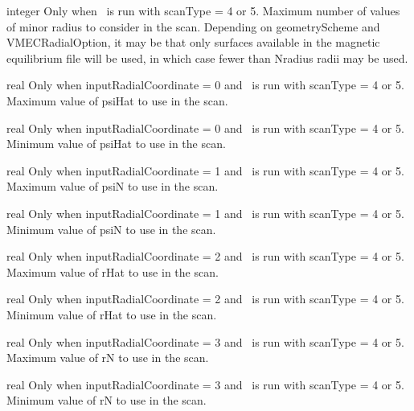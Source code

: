 \myhrule

{integer}
{Only when \sfincsScan~is run with {\ttfamily scanType} = 4 or 5.}
{Maximum number of values of minor radius to consider in the scan.
Depending on {\ttfamily geometryScheme} and {\ttfamily VMECRadialOption},
it may be that only surfaces available in the magnetic equilibrium file will be
used, in which case fewer than {\ttfamily Nradius} radii may be used.}

\myhrule

{real}
{Only when {\ttfamily inputRadialCoordinate} = 0 and \sfincsScan~is run with {\ttfamily scanType} = 4 or 5.}
{Maximum value of {\ttfamily psiHat} to use in the scan.}

\myhrule

{real}
{Only when {\ttfamily inputRadialCoordinate} = 0 and \sfincsScan~is run with {\ttfamily scanType} = 4 or 5.}
{Minimum value of {\ttfamily psiHat} to use in the scan.}

\myhrule

{real}
{Only when {\ttfamily inputRadialCoordinate} = 1 and \sfincsScan~is run with {\ttfamily scanType} = 4 or 5.}
{Maximum value of {\ttfamily psiN} to use in the scan.}

\myhrule

{real}
{Only when {\ttfamily inputRadialCoordinate} = 1 and \sfincsScan~is run with {\ttfamily scanType} = 4 or 5.}
{Minimum value of {\ttfamily psiN} to use in the scan.}

\myhrule

{real}
{Only when {\ttfamily inputRadialCoordinate} = 2 and \sfincsScan~is run with {\ttfamily scanType} = 4 or 5.}
{Maximum value of {\ttfamily rHat} to use in the scan.}

\myhrule

{real}
{Only when {\ttfamily inputRadialCoordinate} = 2 and \sfincsScan~is run with {\ttfamily scanType} = 4 or 5.}
{Minimum value of {\ttfamily rHat} to use in the scan.}

\myhrule

{real}
{Only when {\ttfamily inputRadialCoordinate} = 3 and \sfincsScan~is run with {\ttfamily scanType} = 4 or 5.}
{Maximum value of {\ttfamily rN} to use in the scan.}

\myhrule

{real}
{Only when {\ttfamily inputRadialCoordinate} = 3 and \sfincsScan~is run with {\ttfamily scanType} = 4 or 5.}
{Minimum value of {\ttfamily rN} to use in the scan.}



